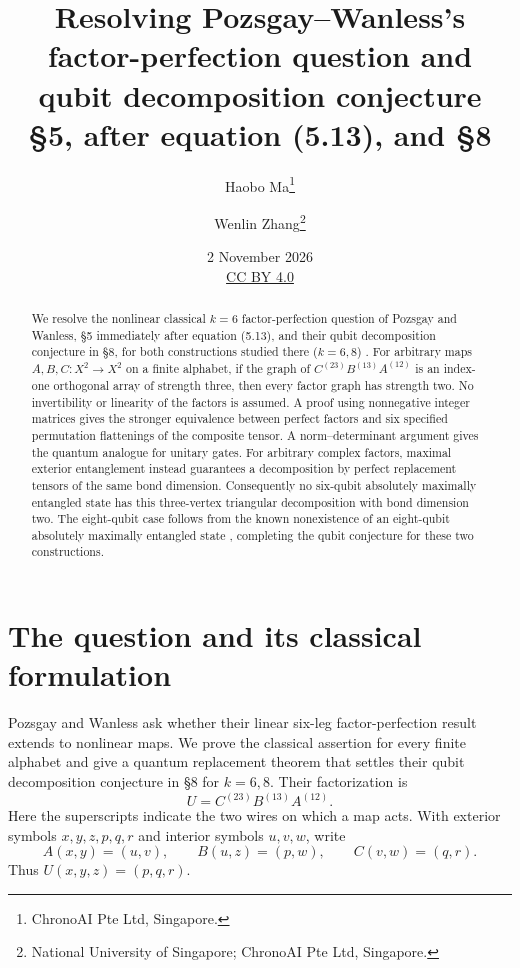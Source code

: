\documentclass[11pt]{article}
\title{Resolving Pozsgay--Wanless's factor-perfection question
and qubit decomposition conjecture\\[4pt]
\large \S5, after equation (5.13), and \S8}
\author{Haobo Ma\thanks{ChronoAI Pte Ltd, Singapore.}\and
Wenlin Zhang\thanks{National University of Singapore; ChronoAI Pte Ltd, Singapore.}}
\date{2 November 2026\\[3pt]\small
\href{https://creativecommons.org/licenses/by/4.0/}{CC BY 4.0}}
\begin{document}
\maketitle
\begin{abstract}
We resolve the nonlinear classical $k=6$ factor-perfection question of
Pozsgay and Wanless, \S5 immediately after equation (5.13), and their
qubit decomposition conjecture in \S8, for both constructions studied
there ($k=6,8$) \cite{PW}.
For arbitrary maps $A,B,C:X^2\to X^2$ on a finite alphabet, if the graph of
$C^{(23)}B^{(13)}A^{(12)}$ is an index-one orthogonal array of strength three,
then every factor graph has strength two. No invertibility or linearity of
the factors is assumed. A proof using nonnegative integer matrices gives
the stronger equivalence between perfect factors and six specified
permutation flattenings of the composite tensor. A norm--determinant
argument gives the quantum analogue for unitary gates. For arbitrary
complex factors, maximal exterior entanglement instead guarantees a
decomposition by perfect replacement tensors of the same bond dimension.
Consequently no six-qubit absolutely maximally entangled state has this
three-vertex triangular decomposition with bond dimension two. The
eight-qubit case follows from the known nonexistence of an eight-qubit
absolutely maximally entangled state \cite{Rains,Scott}, completing the
qubit conjecture for these two constructions.
\end{abstract}

\section{The question and its classical formulation}
Pozsgay and Wanless \cite[\S5, paragraph after (5.13)]{PW} ask whether
their linear six-leg factor-perfection result extends to nonlinear maps.
We prove the classical assertion for every finite alphabet and give a
quantum replacement theorem that settles their qubit decomposition
conjecture in \S8 for $k=6,8$. Their
factorization is \cite[(4.2)]{PW}
\begin{equation}\label{circuit}
 U=C^{(23)}B^{(13)}A^{(12)}.
\end{equation}
Here the superscripts indicate the two wires on which a map acts.
With exterior symbols $x,y,z,p,q,r$ and interior symbols $u,v,w$, write
\begin{equation}\label{wires}
 A(x,y)=(u,v),\qquad B(u,z)=(p,w),\qquad C(v,w)=(q,r).
\end{equation}
Thus $U(x,y,z)=(p,q,r)$.
\end{document}
